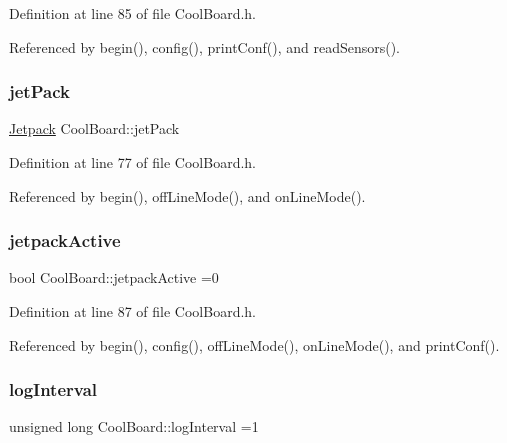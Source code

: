 Definition at line 85 of file Cool\+Board.\+h.



Referenced by begin(), config(), print\+Conf(), and read\+Sensors().

\mbox{\label{classCoolBoard_a30b1357881b01ccbec676856a91e48e9}} 
\subsubsection{\texorpdfstring{jet\+Pack}{jetPack}}
{\footnotesize\ttfamily \hyperlink{classJetpack}{Jetpack} Cool\+Board\+::jet\+Pack\hspace{0.3cm}{\ttfamily [private]}}



Definition at line 77 of file Cool\+Board.\+h.



Referenced by begin(), off\+Line\+Mode(), and on\+Line\+Mode().

\mbox{\label{classCoolBoard_a9be03a913d26e558328935ca3b59a75e}} 
\subsubsection{\texorpdfstring{jetpack\+Active}{jetpackActive}}
{\footnotesize\ttfamily bool Cool\+Board\+::jetpack\+Active =0\hspace{0.3cm}{\ttfamily [private]}}



Definition at line 87 of file Cool\+Board.\+h.



Referenced by begin(), config(), off\+Line\+Mode(), on\+Line\+Mode(), and print\+Conf().

\mbox{\label{classCoolBoard_a84bc94413b64973e4aba8c467c97006c}} 
\subsubsection{\texorpdfstring{log\+Interval}{logInterval}}
{\footnotesize\ttfamily unsigned long Cool\+Board\+::log\+Interval =1\hspace{0.3cm}{\ttfamily [private]}}



